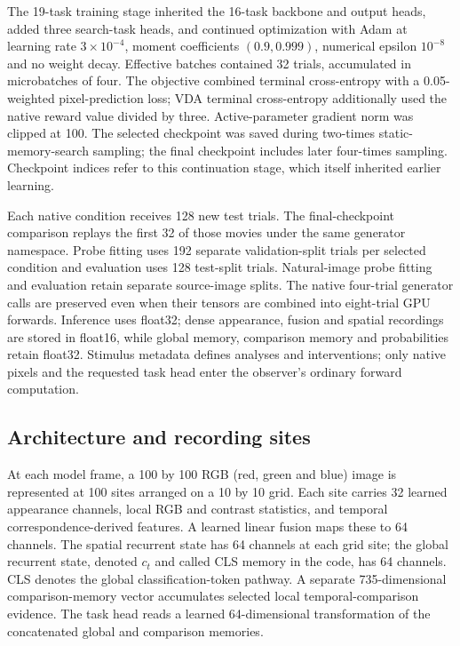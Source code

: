 \documentclass[11pt]{article}
\begin{document}
The 19-task training stage inherited the 16-task backbone and output heads, added three search-task heads, and continued optimization with Adam at learning rate $3\times10^{-4}$, moment coefficients $(0.9,0.999)$, numerical epsilon $10^{-8}$ and no weight decay. Effective batches contained 32 trials, accumulated in microbatches of four. The objective combined terminal cross-entropy with a 0.05-weighted pixel-prediction loss; VDA terminal cross-entropy additionally used the native reward value divided by three. Active-parameter gradient norm was clipped at 100. The selected checkpoint was saved during two-times static-memory-search sampling; the final checkpoint includes later four-times sampling. Checkpoint indices refer to this continuation stage, which itself inherited earlier learning.

Each native condition receives 128 new test trials. The final-checkpoint comparison replays the first 32 of those movies under the same generator namespace. Probe fitting uses 192 separate validation-split trials per selected condition and evaluation uses 128 test-split trials. Natural-image probe fitting and evaluation retain separate source-image splits. The native four-trial generator calls are preserved even when their tensors are combined into eight-trial GPU forwards. Inference uses float32; dense appearance, fusion and spatial recordings are stored in float16, while global memory, comparison memory and probabilities retain float32. Stimulus metadata defines analyses and interventions; only native pixels and the requested task head enter the observer's ordinary forward computation.

\subsection{Architecture and recording sites}
At each model frame, a 100 by 100 RGB (red, green and blue) image is represented at 100 sites arranged on a 10 by 10 grid. Each site carries 32 learned appearance channels, local RGB and contrast statistics, and temporal correspondence-derived features. A learned linear fusion maps these to 64 channels. The spatial recurrent state has 64 channels at each grid site; the global recurrent state, denoted $c_t$ and called CLS memory in the code, has 64 channels. CLS denotes the global classification-token pathway. A separate 735-dimensional comparison-memory vector accumulates selected local temporal-comparison evidence. The task head reads a learned 64-dimensional transformation of the concatenated global and comparison memories.
\end{document}
